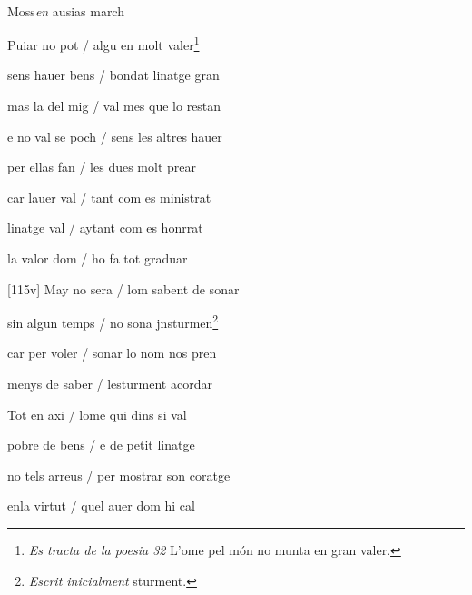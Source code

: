 \documentclass[12pt]{article}
\renewcommand{\espaiAbansEtiquetaPoema}{\vspace{0ex}}
\begin{document}
\begin{estrofa}

\espaiAbansEtiquetaPoema

\\

\begin{rubrica}

Moss\textit{en} ausias march

\end{rubrica}

\end{estrofa}


\begin{estrofa}

 Puiar no pot / algu en molt valer\footnote{\textit{Es tracta de la poesia 32}
L'ome pel m\'{o}n no munta en gran valer.}

 sens hauer bens / bondat linatge gran

 mas la del mig / val mes que lo restan

 e no val se poch / sens les altres hauer

 per ellas fan / les dues molt prear

 car lauer val / tant com es ministrat

 linatge val / aytant com es honrrat

 la valor dom / ho fa tot graduar

\end{estrofa}



\begin{estrofa}

 [115v] May no sera / lom sabent de sonar

 sin algun temps / no sona jnsturmen\footnote{\textit{Escrit inicialment}
sturment.}

 car per voler / sonar lo nom nos pren

 menys de saber / lesturment acordar

 Tot en axi / lome qui dins si val

 pobre de bens / e de petit linatge

 no tels arreus / per mostrar son coratge

 enla virtut / quel auer dom hi cal

\end{estrofa}
\end{document}
